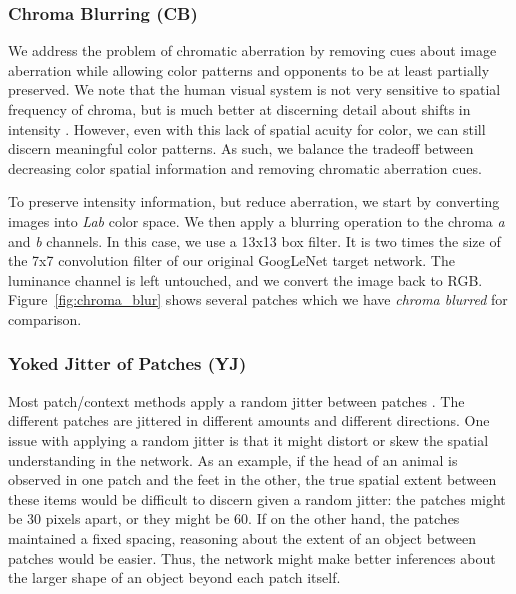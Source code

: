 \documentclass[10pt,twocolumn,letterpaper]{article}
\begin{document}
\subsubsection{Chroma Blurring (CB)}

We address the problem of chromatic aberration by removing cues about image aberration while allowing color patterns and opponents to be at least partially preserved. We note that the human visual system is not very sensitive to spatial frequency of chroma, but is much better at discerning detail about shifts in intensity \cite{Livingstone02}. However, even with this lack of spatial acuity for color, we can still discern meaningful color patterns. As such, we balance the tradeoff between decreasing color spatial information and removing chromatic aberration cues.

To preserve intensity information, but reduce aberration, we start by converting images into \emph{Lab} color space. We then apply a blurring operation to the chroma \emph{a} and \emph{b} channels. In this case, we use a 13x13 box filter. It is two times the size of the 7x7 convolution filter of our original GoogLeNet target network. The luminance channel is left untouched, and we convert the image back to RGB. Figure~\ref{fig:chroma_blur} shows several patches which we have \emph{chroma blurred} for comparison.

\subsubsection{Yoked Jitter of Patches (YJ)}

Most patch/context methods apply a random jitter between patches \cite{Doersch15,Noroozi16a,Doersch17,Lee17}. The different patches are jittered in different amounts and different directions.  One issue with applying a random jitter is that it might distort or skew the spatial understanding in the network. As an example, if the head of an animal is observed in one patch and the feet in the other, the true spatial extent between these items would be difficult to discern given a random jitter: the patches might be 30 pixels apart, or they might be 60. If on the other hand, the patches maintained a fixed spacing, reasoning about the extent of an object between patches would be easier. Thus, the network might make better inferences about the larger shape of an object beyond each patch itself. 
\end{document}
